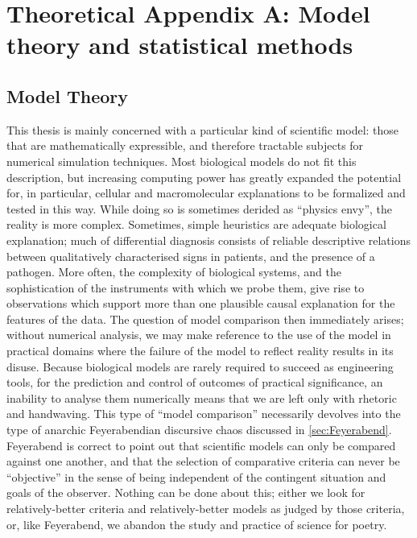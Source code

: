 \chapter{Theoretical Appendix A: Model theory and statistical methods}

\section{Model Theory}
This thesis is mainly concerned with a particular kind of scientific model: those that are mathematically expressible, and therefore tractable subjects for numerical simulation techniques. Most biological models do not fit this description, but increasing computing power has greatly expanded the potential for, in particular, cellular and macromolecular explanations to be formalized and tested in this way. While doing so is sometimes derided as ``physics envy'', the reality is more complex. Sometimes, simple heuristics are adequate biological explanation; much of differential diagnosis consists of reliable descriptive relations between qualitatively characterised signs in patients, and the presence of a pathogen. More often, the complexity of biological systems, and the sophistication of the instruments with which we probe them, give rise to observations which support more than one plausible causal explanation for the features of the data. The question of model comparison then immediately arises; without numerical analysis, we may make reference to the use of the model in practical domains where the failure of the model to reflect reality results in its disuse. Because biological models are rarely required to succeed as engineering tools, for the prediction and control of outcomes of practical significance, an inability to analyse them numerically means that we are left only with rhetoric and handwaving. This type of ``model comparison'' necessarily devolves into the type of anarchic Feyerabendian discursive chaos discussed in \autoref{sec:Feyerabend}. Feyerabend is correct to point out that scientific models can only be compared against one another, and that the selection of comparative criteria can never be ``objective'' in the sense of being independent of the contingent situation and goals of the observer. Nothing can be done about this; either we look for relatively-better criteria and relatively-better models as judged by those criteria, or, like Feyerabend, we abandon the study and practice of science for poetry.

